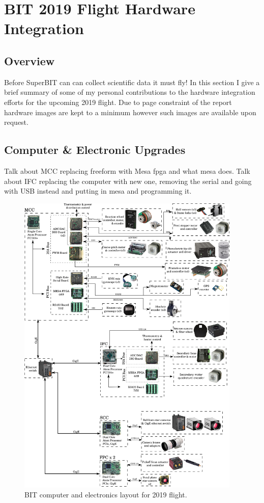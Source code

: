 \chapter{BIT 2019 Flight Hardware Integration}
\section{Overview}
Before SuperBIT can can collect scientific data it must fly! In this section I give a brief summary of some of my personal contributions to the hardware integration efforts for the upcoming 2019 flight. Due to page constraint of the report hardware images are kept to a minimum however such images are available upon request. 


\section{Computer \& Electronic Upgrades}
Talk about MCC replacing freeform with Mesa fpga and what mesa does. 
Talk about IFC replacing the computer with new one, removing the serial and going with USB instead and putting in mesa and programming it.

\begin{figure}
    \begin{small}
        \begin{center}
            \includegraphics[width=0.95\textwidth]{Hardware/figs/electronics.png}
        \end{center}
        \caption{BIT computer and electronics layout for 2019 flight.}
        \label{fig:electronics}
    \end{small}
\end{figure}

